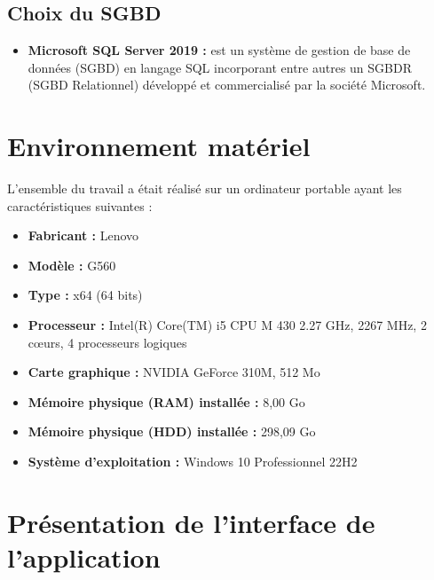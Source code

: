         \subsection[Choix du SGBD]{Choix du SGBD}
            \begin{itemize}
                \setlength{\itemsep}{0pt}
                \item [\ding{226}] \textbf{Microsoft SQL Server 2019 :} est un système de gestion de base de données (SGBD) en langage SQL
                incorporant entre autres un SGBDR (SGBD Relationnel) développé et commercialisé par la société Microsoft.
            \end{itemize}
    \section[Environnement matériel]{Environnement matériel}
    L'ensemble du travail a était réalisé sur un ordinateur portable
    ayant les caractéristiques suivantes :
    \begin{itemize}
        \setlength{\itemsep}{0pt}
        \item [\ding{228}] \textbf{Fabricant :} Lenovo
        \item [\ding{228}] \textbf{Modèle :} G560
        \item [\ding{228}] \textbf{Type :} x64 (64 bits)
        \item [\ding{228}] \textbf{Processeur :} Intel(R) Core(TM) i5 CPU M 430 2.27 GHz, 2267 MHz, 2 cœurs, 4 processeurs logiques
        \item [\ding{228}] \textbf{Carte graphique :} NVIDIA GeForce 310M, 512 Mo
        \item [\ding{228}] \textbf{Mémoire physique (RAM) installée :} 8,00 Go
        \item [\ding{228}] \textbf{Mémoire physique (HDD) installée :} 298,09 Go
        \item [\ding{228}] \textbf{Système d'exploitation :} Windows 10 Professionnel 22H2
    \end{itemize}
    \section[Présentation de l’interface de l’application]{Présentation de l’interface de l’application}
